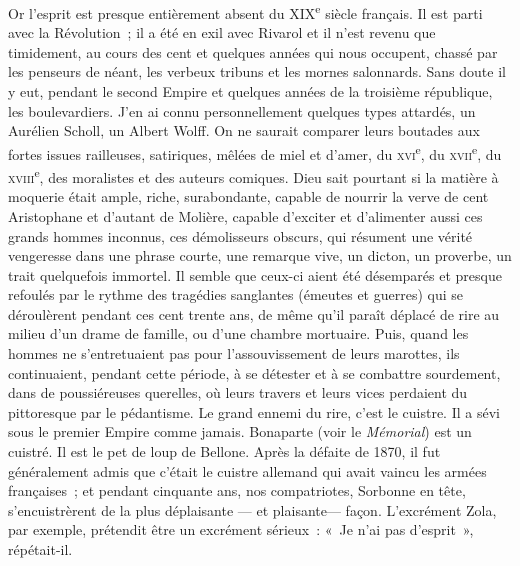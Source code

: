 \documentclass[french,twoside]{book} %
\begin{document}
Or l’esprit est presque entièrement absent du XIX\textsuperscript{e} siècle français. Il est parti avec la Révolution ; il a été en exil avec Rivarol et il n’est revenu que timidement, au cours des cent et quelques années qui nous occupent, chassé par les penseurs de néant, les verbeux tribuns et les mornes salonnards. Sans doute il y eut, pendant le second Empire et quelques années de la troisième république, les boulevardiers. J’en ai connu personnellement quelques types attardés, un Aurélien Scholl, un Albert Wolff. On ne saurait comparer leurs boutades aux fortes issues railleuses, satiriques, mêlées de miel et d’amer, du \textsc{xvi}\textsuperscript{e}, du \textsc{xvii}\textsuperscript{e}, du \textsc{xviii}\textsuperscript{e}, des moralistes et des auteurs comiques. Dieu sait pourtant si la matière à moquerie était ample, riche, surabondante, capable de nourrir la verve de cent Aristophane et d’autant de Molière, capable d’exciter et d’alimenter aussi ces grands hommes inconnus, ces démolisseurs obscurs, qui résument une vérité vengeresse dans une phrase courte, une remarque vive, un dicton, un proverbe, un trait quelquefois immortel. Il semble que ceux-ci aient été désemparés et presque refoulés par le rythme des tragédies sanglantes (émeutes et guerres) qui se déroulèrent pendant ces cent trente ans, de même qu’il paraît déplacé de rire au milieu d’un drame de famille, ou d’une chambre mortuaire. Puis, quand les hommes ne s’entretuaient pas pour l’assouvissement de leurs marottes, ils continuaient, pendant cette période, à se détester et à se combattre sourdement, dans de poussiéreuses querelles, où leurs travers et leurs vices perdaient du pittoresque par le pédantisme. Le grand ennemi du rire, c’est le cuistre. Il a sévi sous le premier Empire comme jamais. Bonaparte (voir le {\itshape Mémorial}) est un cuistré. Il est le pet de loup de Bellone. Après la défaite de 1870, il fut généralement admis que c’était le cuistre allemand qui avait vaincu les armées françaises ; et pendant cinquante ans, nos compatriotes, Sorbonne en tête, s’encuistrèrent de la plus déplaisante — et plaisante— façon. L’excrément Zola, par exemple, prétendit être un excrément sérieux : « Je n’ai pas d’esprit », répétait-il.\par
\end{document}
